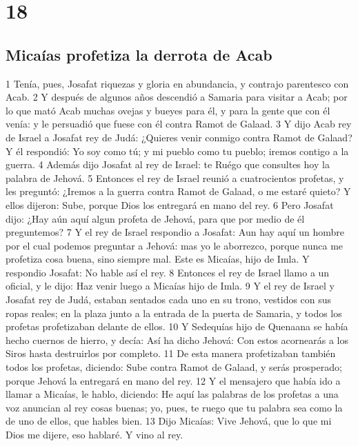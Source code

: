 \chapter{18}

\section*{Micaías profetiza la derrota de Acab}

 

1 Tenía, pues, Josafat riquezas y gloria en abundancia, y contrajo parentesco con Acab.
2 Y después de algunos años descendió a Samaria para visitar a Acab; por lo que mató Acab muchas ovejas y bueyes para él, y para la gente que con él venía: y le persuadió que fuese con él contra Ramot de Galaad.
3 Y dijo Acab rey de Israel a Josafat rey de Judá: ¿Quieres venir conmigo contra Ramot de Galaad? Y él respondió: Yo soy como tú; y mi pueblo como tu pueblo; iremos contigo a la guerra.
4 Además dijo Josafat al rey de Israel: te Ruégo que consultes hoy la palabra de Jehová.
5 Entonces el rey de Israel reunió a cuatrocientos profetas, y les preguntó: ¿Iremos a la guerra contra Ramot de Galaad, o me estaré quieto? Y ellos dijeron: Sube, porque Dios los entregará en mano del rey.
6 Pero Josafat dijo: ¿Hay aún aquí algun profeta de Jehová, para que por medio de él preguntemos?
7 Y el rey de Israel respondio a Josafat: Aun hay aquí un hombre por el cual podemos preguntar a Jehová: mas yo le aborrezco, porque nunca me profetiza cosa buena, sino siempre mal. Este es Micaías, hijo de Imla. Y respondio Josafat: No hable así el rey.
8 Entonces el rey de Israel llamo a un oficial, y le dijo: Haz venir luego a Micaías hijo de Imla.
9 Y el rey de Israel y Josafat rey de Judá, estaban sentados cada uno en su trono, vestidos con sus ropas reales; en la plaza junto a la entrada de la puerta de Samaria, y todos los profetas profetizaban delante de ellos.
10 Y Sedequías hijo de Quenaana se había hecho cuernos de hierro, y decía: Así ha dicho Jehová: Con estos acornearás a los Siros hasta destruirlos por completo.
11 De esta manera profetizaban también todos los profetas, diciendo: Sube contra Ramot de Galaad, y serás prosperado; porque Jehová la entregará en mano del rey.
12 Y el mensajero que había ido a llamar a Micaías, le hablo, diciendo: He aquí las palabras de los profetas a una voz anuncian al rey cosas buenas; yo, pues, te ruego que tu palabra sea como la de uno de ellos, que hables bien.
13 Dijo Micaías: Vive Jehová, que lo que mi Dios me dijere, eso hablaré. Y vino al rey. 
